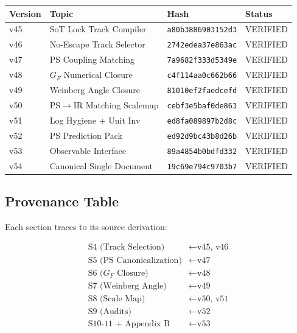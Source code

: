 \documentclass[11pt,a4paper]{article}
\begin{document}
\begin{hashbox}
\label{box:hash-chain}
\begin{center}
\begin{tabular}{llll}
\toprule
\textbf{Version} & \textbf{Topic} & \textbf{Hash} & \textbf{Status} \\
\midrule
v45 & SoT Lock Track Compiler & \texttt{a80b3886903152d3} & VERIFIED \\
v46 & No-Escape Track Selector & \texttt{2742edea37e863ac} & VERIFIED \\
v47 & PS Coupling Matching & \texttt{7a9682f333d5349e} & VERIFIED \\
v48 & $G_F$ Numerical Closure & \texttt{c4f114aa0c662b66} & VERIFIED \\
v49 & Weinberg Angle Closure & \texttt{81010ef2faedcefd} & VERIFIED \\
v50 & PS$\to$IR Matching Scalemap & \texttt{cebf3e5baf0de863} & VERIFIED \\
v51 & Log Hygiene + Unit Inv & \texttt{ed8fa089897b2d8c} & VERIFIED \\
v52 & PS Prediction Pack & \texttt{ed92d9bc43b8d26b} & VERIFIED \\
v53 & Observable Interface & \texttt{89a4854b0bdfd332} & VERIFIED \\
v54 & Canonical Single Document & \texttt{19c69e794c9703b7} & VERIFIED \\
\bottomrule
\end{tabular}
\end{center}
\end{hashbox}

\subsection{Provenance Table}
\label{subsec:provenance}

Each section traces to its source derivation:

\begin{equation}
\label{eq:provenance-map}
\begin{aligned}
\text{S4 (Track Selection)} &\leftarrow \text{v45, v46} \\
\text{S5 (PS Canonicalization)} &\leftarrow \text{v47} \\
\text{S6 ($G_F$ Closure)} &\leftarrow \text{v48} \\
\text{S7 (Weinberg Angle)} &\leftarrow \text{v49} \\
\text{S8 (Scale Map)} &\leftarrow \text{v50, v51} \\
\text{S9 (Audits)} &\leftarrow \text{v52} \\
\text{S10-11 + Appendix B} &\leftarrow \text{v53}
\end{aligned}
\end{equation}
\end{document}

